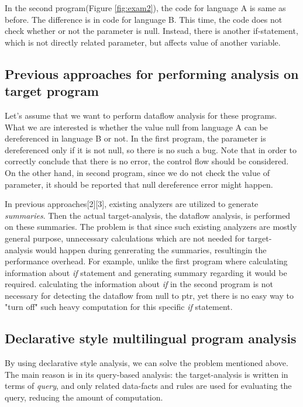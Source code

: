 In the second program(Figure \ref{fig:exam2}), the code for language A is same
as before. The difference is in code for language B. This time, the code does
not check whether or not the parameter is null. Instead, there is another
if-statement, which is not directly related parameter, but affects value of
  another variable.

\subsection{Previous approaches for performing analysis on target program}

Let's assume that we want to perform dataflow analysis for these programs.
What we are interested is whether the value null from language A can be
dereferenced in language B or not. In the first program, the parameter is
dereferenced only if it is not null, so there is no such a bug. Note that in
order to correctly conclude that there is no error, the control flow should be
considered. On the other hand, in second program, since we do not check the
value of parameter, it should be reported that null dereference error might
happen.

In previous approaches[2][3], existing analyzers are utilized to generate
\textit{summaries}. Then the actual target-analysis, the dataflow analysis, is
performed on these summaries. The problem is that since such existing analyzers
are mostly general purpose, unnecessary calculations which are not needed for
target-analysis would happen during genrerating the summaries, resultingin the
performance overhead. For example, unlike the first program where calculating
information about \textit{if} statement and generating summary regarding it
would be required. calculating the information about \textit{if} in the second
program is not necessary for detecting the dataflow from null to ptr, yet there
is no easy way to "turn off" such heavy computation for this specific
\textit{if} statement.

\subsection{Declarative style multilingual program analysis}

By using declarative style analysis, we can solve the problem mentioned above.
The main reason is in its query-based analysis: the target-analysis is
written in terms of \textit{query}, and only related data-facts and rules
are used for evaluating the query, reducing the amount of computation.

